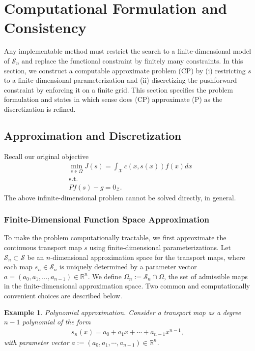 \documentclass[12pt,leqno]{amsart}
\newtheorem{example}{Example}
\begin{document}
\section{Computational Formulation and Consistency}\label{sec:cp}
Any implementable method must restrict the search to a finite-dimensional model of $\mathcal{S}_n$ and replace the functional constraint by finitely many constraints. In this section, we construct a computable approximate problem (CP) by (i) restricting $s$ to a finite-dimensional parameterization and (ii) discretizing the pushforward constraint by enforcing it on a finite grid.
This section specifies the problem formulation and states in which sense does (CP) approximate (P) as the discretization is refined.

\subsection{Approximation and Discretization}\label{subsec:approx}
Recall our original objective 
\begin{align*}
    &\min_{s\in\Omega} J(s)=\int_{\mathcal{X}} c(x, s(x))f(x)dx \tag{P}\\
    &\text{s.t.} \\
    & Pf(s)-g =0_{\mathcal{Z}}.
\end{align*}
The above infinite-dimensional problem cannot be solved directly, in general. 

\subsubsection{Finite-Dimensional Function Space Approximation}
To make the problem computationally tractable, we first approximate the continuous transport map $s$ using finite-dimensional parameterizations. Let $\mathcal{S}_n \subset \mathcal{S}$ be an $n$-dimensional approximation space for the transport maps, where each map $s_n \in \mathcal{S}_n$ is uniquely determined by a parameter vector $a = (a_0, a_1, \dots, a_{n-1}) \in \mathbb{R}^n$. We define $\Omega_n:=\mathcal{S}_n\cap\Omega$, the set of admissible maps in the finite-dimensional approximation space. Two common and computationally convenient choices are described below.

\begin{example}{Polynomial approximation.}
Consider a transport map as a degree $n-1$ polynomial of the form
\begin{align*}
    s_n(x) = a_0 + a_1x + \cdots+ a_{n-1}x^{n-1},
\end{align*}
with parameter vector $a:=(a_0, a_1, \cdots, a_{n-1})\in\mathbb R^n$.
\end{example}
\end{document}
